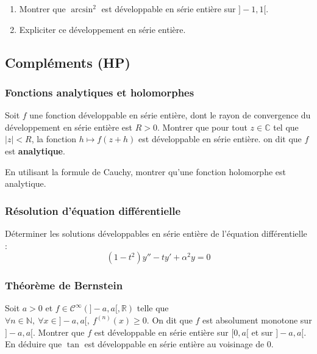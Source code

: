 \documentclass[french]{article}
\newcommand{\N}{\mathbb{N}}
\newcommand{\R}{\mathbb{R}}
\newcommand{\C}{\mathbb{C}}
\theoremstyle{plain}
\theoremstyle{definition}
\theoremstyle{remark}
\begin{document}
\begin{exo}
	\begin{enumerate}
		\item Montrer que $\arcsin^2$ est développable en série entière sur $]-1,1[$.
		\item Expliciter ce développement en série entière.
	\end{enumerate}
\end{exo}

\subsection{Compléments (HP)}

\subsubsection*{Fonctions analytiques et holomorphes}

\begin{exo}
	Soit $f$ une fonction développable en série entière, dont le rayon de convergence du développement en série entière est $R>0$. Montrer que pour tout $z\in\C$ tel que $\lvert z\rvert <R$, la fonction $h\mapsto f(z+h)$ est développable en série entière. on dit que $f$ est \textbf{analytique}.
\end{exo}

\begin{exo}
	En utilisant la formule de Cauchy, montrer qu'une fonction holomorphe est analytique.
\end{exo}

\subsubsection*{Résolution d'équation différentielle}

\begin{exo}
	Déterminer les solutions développables en série entière de l'équation différentielle : $$ (1-t^2)y''-ty'+\alpha^2y=0$$
\end{exo}

\subsubsection*{Théorème de Bernstein}

\begin{exo}
	Soit $a>0$ et $f\in\mathcal{C}^\infty(]-a,a[,\R)$ telle que $\forall n\in\N,\ \forall x\in]-a,a[,\ f^{(n)}(x)\geqslant 0$. On dit que $f$ est absolument monotone sur $]-a,a[$. Montrer que $f$ est développable en série entière sur $[0,a[$ et sur $]-a,a[$. \\
	En déduire que $\tan$ est développable en série entière au voisinage de $0$.
\end{exo}
\end{document}
